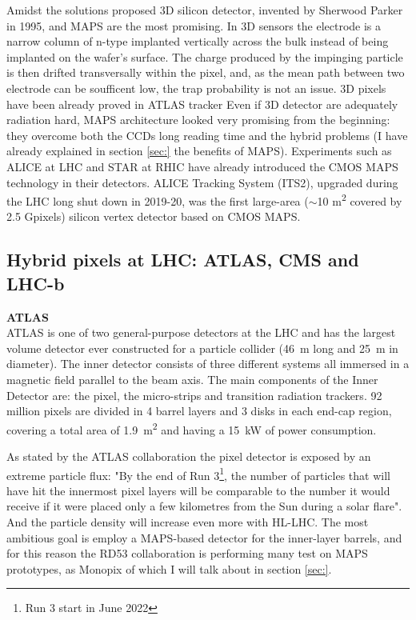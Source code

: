     Amidst the solutions proposed 3D silicon detector, invented by Sherwood Parker in 1995, and MAPS are the most promising. In 3D sensors the electrode is a narrow column of n-type implanted vertically across the bulk instead of being implanted on the wafer's surface. 
    The charge produced by the impinging particle is then drifted transversally within the pixel, and, as the mean path between two electrode can be soufficent low, the trap probability is not an issue. 
    3D pixels have been already proved in ATLAS tracker  
    Even if 3D detector are adequately radiation hard, MAPS architecture looked very promising from the beginning: they overcome both the CCDs long reading time and the hybrid problems (I have already explained in section \ref{sec:} the benefits of MAPS). 
    Experiments such as ALICE at LHC and STAR at RHIC have already introduced the CMOS MAPS technology in their detectors. ALICE Tracking System (ITS2), upgraded during the LHC long shut down in 2019-20, was the first large-area ($\sim$10 \si{m\squared} covered by 2.5 Gpixels) silicon vertex detector based on CMOS MAPS.

    \subsection{Hybrid pixels at LHC: ATLAS, CMS and LHC-b}
        \textbf{ATLAS}\\
        ATLAS is one of two general-purpose detectors at the LHC and has the largest volume detector ever constructed for a particle
        collider (\SI{46}{m} long and \SI{25}{m} in diameter).  
        The inner detector consists of three different systems all immersed in a magnetic field parallel to the beam axis. The main components of the Inner Detector are: the pixel, the micro-strips and transition radiation trackers. 92 million pixels are divided in 4 barrel layers and 3 disks in each end-cap region, covering a total area of \SI{1.9}{m\squared} and having a \SI{15}{kW} of power consumption.

        As stated by the ATLAS collaboration the pixel detector is exposed by an extreme particle flux: "By the end of Run 3\footnote{Run 3 start in June 2022}, the number of particles that will have hit the innermost pixel layers will be comparable to the number it would receive if it were placed only a few kilometres from the Sun during a solar flare". And the particle density will increase even more with HL-LHC. 
        The most ambitious goal is employ a MAPS-based detector for the inner-layer barrels, and for this reason the RD53 collaboration is performing many test on MAPS prototypes, as Monopix of which I will talk about in section \ref{sec:}.
        
